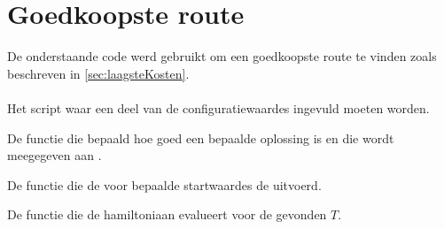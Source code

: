 \section{Goedkoopste route}
De onderstaande code werd gebruikt om een goedkoopste route te vinden zoals beschreven in \ref{sec:laagsteKosten}.\\
\\
Het script waar een deel van de configuratiewaardes ingevuld moeten worden.


De functie die bepaald hoe goed een bepaalde oplossing is en die wordt meegegeven aan .


De functie die de voor bepaalde startwaardes de  uitvoerd.


De functie die de hamiltoniaan evalueert voor de gevonden \(T\).

